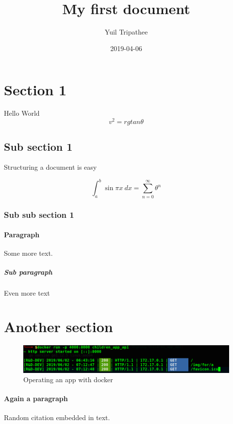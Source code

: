 \documentclass[a4paper]{article}
\title{My first document}
\date{2019-04-06}
\author{Yuil Tripathee}
\begin{document}
	\maketitle
	\newpage
	\tableofcontents
	\newpage
	\listoffigures
	\listoftables
	\newpage
	\section{Section 1}
	
	Hello World
	\[ v^2 = rgtan\theta \]
	
	\subsection{Sub section 1}
	
	Structuring a document is easy
	
	\begin{equation}\label{key}
	\int_a^b \sin \pi x~dx = \sum_{n=0}^{\infty} \theta^n
	\end{equation}
	
	
	\subsubsection{Sub sub section 1}
	
	\paragraph{Paragraph}
	
	Some more text.
	
	\subparagraph{Sub paragraph}
	
	Even more text
	
	\section{Another section}
	
	\begin{figure}[H]
		\centering
		\includegraphics[width=\linewidth]{images/docker_app_operation}
		\caption[Operating an app with docker]{Operating an app with docker}
		\label{fig:dockerappoperation}
	\end{figure}

	\paragraph{Again a paragraph}
	Random citation \cite{DUMMY:1} embedded in text.
	
	\newpage	
	
	
	

	
	
\end{document}
